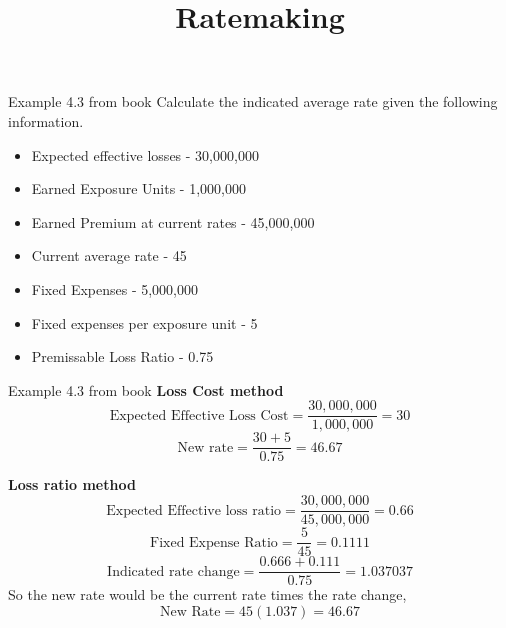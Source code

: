 \documentclass[compress,mathserif]{beamer}
\title{Ratemaking}
\author{}
\institute[Stat 346]{Stat 346 - Short-term Actuarial Math}
\date[ BYU]{}
\begin{document}
\begin{frame}
 \titlepage
\end{frame}

\begin{frame}{Example 4.3 from book}
Calculate the indicated average rate given the following information. 
\begin{itemize}
\item Expected effective losses - 30,000,000
\item Earned Exposure Units - 1,000,000
\item Earned Premium at current rates - 45,000,000
\item Current average rate - 45
\item Fixed Expenses - 5,000,000
\item Fixed expenses per exposure unit - 5
\item Premissable Loss Ratio - 0.75
\end{itemize}

\end{frame}

\begin{frame}{Example 4.3 from book}
\textbf{Loss Cost method}
\[\text{Expected Effective Loss Cost} = \frac{30,000,000}{1,000,000} = 30\]
\[\text{New rate} = \frac{30 + 5}{0.75} = 46.67\]

\textbf{Loss ratio method}
\[\text{Expected Effective loss ratio} =  \frac{30,000,000}{45,000,000} = 0.66\]
\[\text{Fixed Expense Ratio} = \frac{5}{45} = 0.1111\]
\[\text{Indicated rate change} = \frac{0.666 + 0.111}{0.75} = 1.037037\]
So the new rate would be the current rate times the rate change, 
\[\text{New Rate} = 45(1.037) = 46.67\]
\end{frame}
\end{document}
